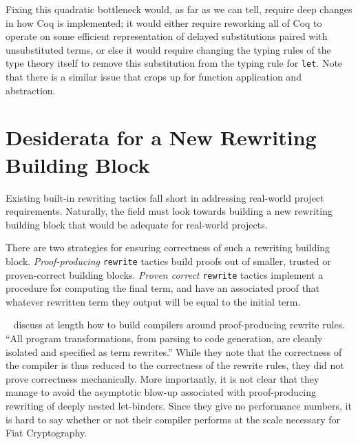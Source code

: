 \documentclass[sn-mathphys,pdflatex]{sn-jnl}%
\newcommand{\citetfield}[1]{\usebibentry{#1}{citet}~\cite{#1}}
\theoremstyle{thmstyleone}%
\theoremstyle{thmstyletwo}%
\theoremstyle{thmstylethree}%
\begin{document}
Fixing this quadratic bottleneck would, as far as we can tell, require deep changes in how Coq is implemented; it would either require reworking all of Coq to operate on some efficient representation of delayed substitutions paired with unsubstituted terms, or else it would require changing the typing rules of the type theory itself to remove this substitution from the typing rule for \texttt{let}.
Note that there is a similar issue that crops up for function application and abstraction.

\section{Desiderata for a New Rewriting Building Block}\label{sec:better-than-status-quo}

Existing built-in rewriting tactics fall short in addressing real-world project requirements.
Naturally, the field must look towards building a new rewriting building block that would be adequate for real-world projects.

There are two strategies for ensuring correctness of such a rewriting building block.
  \emph{Proof-producing} \texttt{rewrite} tactics build proofs out of smaller, trusted or proven-correct building blocks.
  \emph{Proven correct} \texttt{rewrite} tactics implement a procedure for computing the final term, and have an associated proof that whatever rewritten term they output will be equal to the initial term.

  \citetfield{Hickey2006} discuss at length how to build compilers around proof-producing rewrite rules.
``All program transformations, from parsing to code generation, are cleanly isolated and specified as term rewrites.''
While they note that the correctness of the compiler is thus reduced to the correctness of the rewrite rules, they did not prove correctness mechanically.
More importantly, it is not clear that they manage to avoid the asymptotic blow-up associated with proof-producing rewriting of deeply nested let-binders.
Since they give no performance numbers, it is hard to say whether or not their compiler performs at the scale necessary for Fiat Cryptography.

\end{document}

